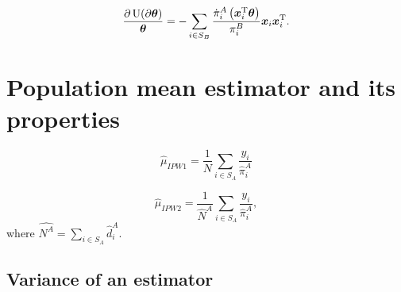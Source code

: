 \documentclass[
  letterpaper,
  DIV=11,
  numbers=noendperiod]{scrreprt}
\begin{document}
\[
\begin{align*}
    \frac{\partial \operatorname{U}(\partial \boldsymbol{\theta})}{\boldsymbol{\theta}} = - \sum_{i \in S_B} \frac{\dot{\pi}_i^A\left(\boldsymbol{x}_i^{\mathrm{T}} \boldsymbol{\theta} \right)}{\pi_i^B} \boldsymbol{x}_i \boldsymbol{x}_i^{\mathrm{T}}.
\end{align*}
\]

\hypertarget{population-mean-estimator-and-its-properties}{%
\section{Population mean estimator and its
properties}\label{population-mean-estimator-and-its-properties}}

\[
\begin{equation*}
    \hat{\mu}_{IPW1} = \frac{1}{N} \sum_{i \in S_A} \frac{y_i}{\hat{\pi}_i^{A}}
\end{equation*}
\]

\[
\begin{equation*}
    \hat{\mu}_{IPW2} = \frac{1}{\hat{N}^{A}} \sum_{i \in S_A} \frac{y_i}{\hat{\pi}_i^{A}},
\end{equation*}
\] where \(\hat{N^A} = \sum_{i \in S_A} \hat{d}_i^A\).

\hypertarget{variance-of-an-estimator}{%
\subsection{Variance of an estimator}\label{variance-of-an-estimator}}
\end{document}
